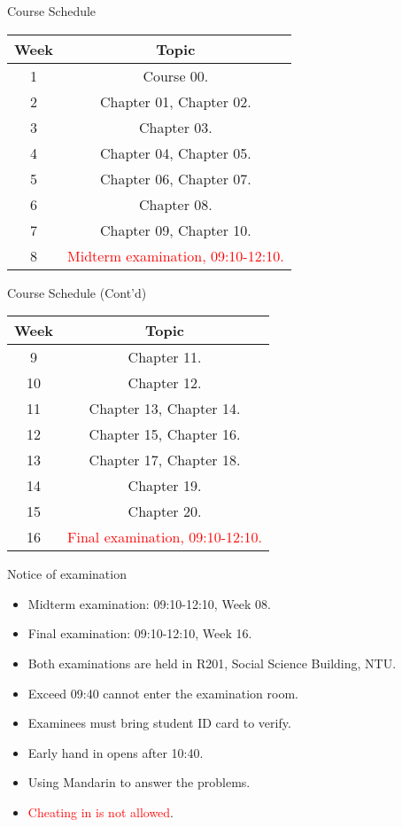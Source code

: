 \documentclass{beamer}
\begin{document}
\begin{frame}{Course Schedule}
\begin{center}
\begin{tabular}{|c|c|}
\hline
Week & Topic \\
\hline
1 & Course 00.\\
\hline
2 & Chapter 01, Chapter 02.\\
\hline
3 & Chapter 03.\\
\hline
4 & Chapter 04, Chapter 05.\\
\hline
5 & Chapter 06, Chapter 07.\\
\hline
6 & Chapter 08.\\
\hline
7 & Chapter 09, Chapter 10.\\
\hline
8 & \textcolor{red}{Midterm examination, 09:10-12:10.}\\
\hline
\end{tabular}
\end{center}
\end{frame}
\begin{frame}{Course Schedule (Cont'd)}
\begin{center}
\begin{tabular}{|c|c|}
\hline
Week & Topic \\
\hline
9 & Chapter 11.\\
\hline
10 & Chapter 12.\\
\hline
11 & Chapter 13, Chapter 14.\\
\hline
12 & Chapter 15, Chapter 16.\\
\hline
13 & Chapter 17, Chapter 18.\\
\hline
14 & Chapter 19.\\
\hline
15 & Chapter 20.\\
\hline
16 & \textcolor{red}{Final examination, 09:10-12:10.}\\
\hline
\end{tabular}
\end{center}
\end{frame}
\begin{frame}{Notice of examination}
    \begin{itemize}
    \pause
    \item Midterm examination: 09:10-12:10, Week 08.
    \pause
    \item Final examination: 09:10-12:10, Week 16.
    \pause
    \item Both examinations are held in R201, Social Science Building, NTU.
    \pause
    \item Exceed 09:40 cannot enter the examination room.
    \pause
    \item Examinees must bring student ID card to verify.
    \pause
    \item Early hand in opens after 10:40.
    \pause
    \item Using Mandarin to answer the problems.
    \pause
    \item \textcolor{red}{Cheating in is not allowed}.
    \end{itemize}
\end{frame}
\end{document}
